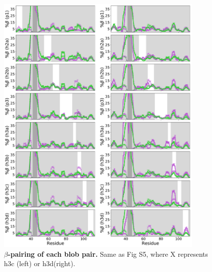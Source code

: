 \documentclass[10pt,letterpaper]{article}
\begin{document}
\begin{figure}[!ht]
\includegraphics[scale=0.5,width=0.9\textwidth,trim={0 0cm 0 0cm},clip]{./figures/S9.pdf}
\caption{{\bf $\beta$-pairing of each blob pair.} Same as Fig S5, where X represents h3c (left) or h3d(right).} 
\label{S8} 
\end{figure}
\end{document}
